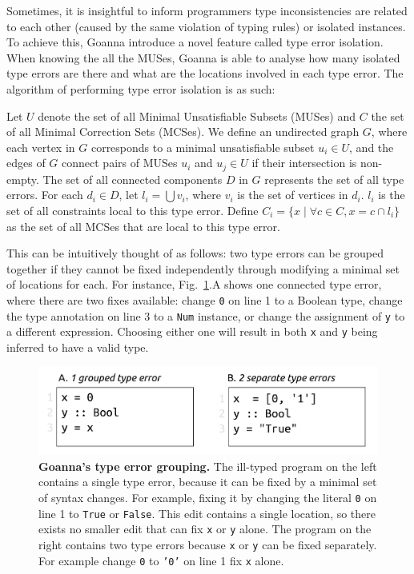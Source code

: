 \documentclass[pdflatex,sn-nature,Numbered]{sn-jnl}%
\begin{document}
Sometimes, it is insightful to inform programmers type inconsistencies are related to each other (caused by the same violation of typing rules) or isolated instances. To achieve this, Goanna introduce a novel feature called type error isolation. When knowing the all the MUSes, Goanna is able to analyse how many isolated type errors are there and what are the locations involved in each type error. The algorithm of performing type error isolation is as such:


	Let $U$ denote the set of all Minimal Unsatisfiable Subsets (MUSes) and $C$ the set of all Minimal Correction Sets (MCSes). We define an undirected graph $G$, where each vertex in $G$ corresponds to a minimal unsatisfiable subset $u_i \in U$, and the edges of $G$ connect pairs of MUSes $u_i$ and $u_j \in U$ if their intersection is non-empty. The set of all connected components $D$ in $G$ represents the set of all type errors. For each $d_i \in D$, let $l_i = \bigcup v_i$, where $v_i$ is the set of vertices in $d_i$. $l_i$ is the set of all constraints local to this type error. Define $C_i = \{ x \mid \forall c \in C, x = c \cap l_i \}$ as the set of all MCSes that are local to this type error.


    This can be intuitively thought of as follows: two type errors can be grouped together if they cannot be fixed independently through modifying a minimal set of locations for each. For instance, Fig.~\ref{fig:grouping-example}.A shows one connected type error, where there are two fixes available: change \texttt{0} on line 1 to a Boolean type, change the type annotation on line 3 to a \texttt{Num} instance, or change the assignment of \texttt{y} to a different expression. Choosing either one will result in both \texttt{x} and \texttt{y} being inferred to have a valid type.
    

   \begin{figure}[ht!]
        \centering
        \includegraphics[width=0.8\linewidth]{images/Grouping-Example}
        \caption[Goanna's type error grouping]{\textbf{Goanna's type error grouping.} The ill-typed program on the left contains a single type error, because it can be fixed by a minimal set of syntax changes. For example, fixing it by changing the literal \texttt{0} on line 1 to \texttt{True} or \texttt{False}. This edit contains a single location, so there exists no smaller edit that can fix \texttt{x} or \texttt{y} alone. The program on the right contains two type errors because \texttt{x} or \texttt{y} can be fixed separately. For example change \texttt{0} to \texttt{'0'} on line 1 fix \texttt{x} alone. }
        \label{fig:grouping-example}
    \end{figure}
\end{document}
